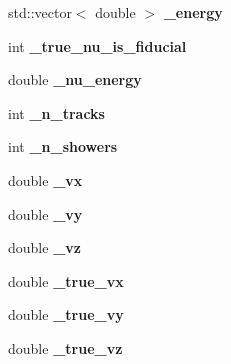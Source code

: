 \begin{DoxyCompactItemize}
\item 
\hypertarget{group__lee_gaf64e85c1a6351ba43d787ae01d82f34e}{std\-::vector$<$ double $>$ {\bfseries \-\_\-energy}}\label{group__lee_gaf64e85c1a6351ba43d787ae01d82f34e}

\item 
\hypertarget{group__lee_ga0fb26f882cca04dd6e9d6162808365c8}{int {\bfseries \-\_\-true\-\_\-nu\-\_\-is\-\_\-fiducial}}\label{group__lee_ga0fb26f882cca04dd6e9d6162808365c8}

\item 
\hypertarget{group__lee_ga23ee0dccbe8495fa418cb6c0020c1643}{double {\bfseries \-\_\-nu\-\_\-energy}}\label{group__lee_ga23ee0dccbe8495fa418cb6c0020c1643}

\item 
\hypertarget{group__lee_ga023bb8e8a12ac261583b6d71fd1c12e2}{int {\bfseries \-\_\-n\-\_\-tracks}}\label{group__lee_ga023bb8e8a12ac261583b6d71fd1c12e2}

\item 
\hypertarget{group__lee_ga18da3a91fd8778add6fbd0c4e2244f89}{int {\bfseries \-\_\-n\-\_\-showers}}\label{group__lee_ga18da3a91fd8778add6fbd0c4e2244f89}

\item 
\hypertarget{group__lee_ga440e3b5b58670672f25f42dd09d0aa21}{double {\bfseries \-\_\-vx}}\label{group__lee_ga440e3b5b58670672f25f42dd09d0aa21}

\item 
\hypertarget{group__lee_gabbf5b67c1538e2771ba997ddd41c9341}{double {\bfseries \-\_\-vy}}\label{group__lee_gabbf5b67c1538e2771ba997ddd41c9341}

\item 
\hypertarget{group__lee_ga640cb654c98033c9294cb1fda9f86b89}{double {\bfseries \-\_\-vz}}\label{group__lee_ga640cb654c98033c9294cb1fda9f86b89}

\item 
\hypertarget{group__lee_ga537783c86380bbaf3357e3633f07ed7f}{double {\bfseries \-\_\-true\-\_\-vx}}\label{group__lee_ga537783c86380bbaf3357e3633f07ed7f}

\item 
\hypertarget{group__lee_gac8bd6c7a1c52045790f54232855c1073}{double {\bfseries \-\_\-true\-\_\-vy}}\label{group__lee_gac8bd6c7a1c52045790f54232855c1073}

\item 
\hypertarget{group__lee_gab2c80253d7af767bc7435a95b714d546}{double {\bfseries \-\_\-true\-\_\-vz}}\label{group__lee_gab2c80253d7af767bc7435a95b714d546}


\end{DoxyCompactItemize}
